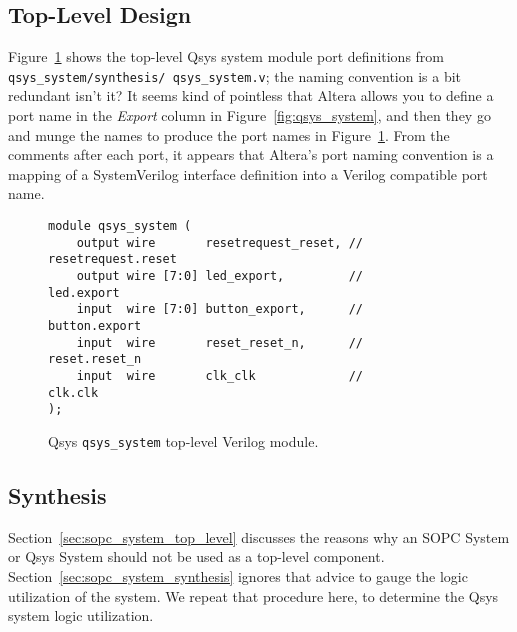 \documentclass[10pt,twoside]{article}
\begin{document}
\clearpage
\subsection{Top-Level Design}

Figure~\ref{fig:qsys_system_verilog} shows the top-level Qsys system
module port definitions from {\tt qsys\_system/synthesis/ qsys\_system.v};
the naming convention is a bit redundant isn't it?\label{bug:8} 
It seems kind of pointless that Altera allows you to define
a port name in the {\em Export} column in Figure~\ref{fig:qsys_system},
and then they go and munge the names to produce the port names in
Figure~\ref{fig:qsys_system_verilog}. From the comments after each port,
it appears that Altera's port naming convention is a mapping of a SystemVerilog
interface definition into a Verilog compatible port name.

%
\lstset{language=Verilog}
\begin{figure}[t]
\begin{center}
\begin{minipage}{0.9\textwidth}
\begin{lstlisting}
module qsys_system (
    output wire       resetrequest_reset, // resetrequest.reset
    output wire [7:0] led_export,         //          led.export
    input  wire [7:0] button_export,      //       button.export
    input  wire       reset_reset_n,      //        reset.reset_n
    input  wire       clk_clk             //          clk.clk
);
\end{lstlisting}
\end{minipage}
\end{center}
\caption{Qsys {\tt qsys\_system} top-level Verilog module.}
\label{fig:qsys_system_verilog}
\end{figure}
%

\subsection{Synthesis}

Section~\ref{sec:sopc_system_top_level} discusses the reasons why
an SOPC System or Qsys System should not be used as a top-level
component. Section~\ref{sec:sopc_system_synthesis} ignores that
advice to gauge the logic utilization of the system. 
We repeat that procedure here, to determine the Qsys system
logic utilization.
\end{document}
